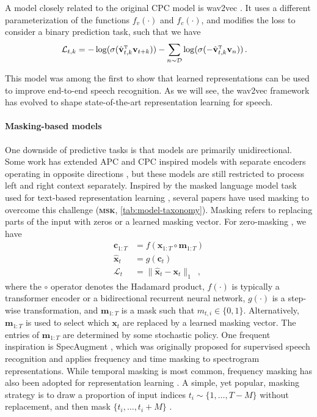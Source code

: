 {A model closely related to the original CPC model is wav2vec \parencite{schneider_wav2vec_2019}. It uses a different parameterization of the functions $f_v(\cdot)$ and $f_c(\cdot)$, and modifies the loss to consider a binary prediction task, such that we have
%
\begin{align}
    \mathcal{L}_{t,k} &= - \log(\sigma(\hat{\mathbf{v}}_{t,k}^{\text{\tiny T}}\mathbf{v}_{t+k})) - \sum_{n \sim \mathcal{D}} \log(\sigma(-\hat{\mathbf{v}}_{t,k}^{\text{\tiny T}}\mathbf{v}_{n})) \,.
    \label{eq_brief: wav2vec loss}
\end{align}

\noindent This model was among the first to show that learned representations can be used to improve end-to-end speech recognition. As we will see, the wav2vec framework has evolved to shape state-of-the-art representation learning for speech.


\paragraph{Masking-based models} One downside of predictive tasks is that models are primarily unidirectional. Some work has extended APC and CPC inspired models with separate encoders operating in opposite directions \parencite{ling_deep_2020, kawakami_learning_2020, borgholt_scaling_2021}, but these models are still restricted to process left and right context separately. Inspired by the masked language model task used for text-based representation learning \parencite{devlin_bert_2018}, several papers have used masking to overcome this challenge (\textbf{\textsc{msk}}, \cref{tab:model-taxonomy}). Masking refers to replacing parts of the input with zeros or a learned masking vector. For zero-masking \parencite{jiang_improving_2019, liu_mockingjay_2020, wang_unsupervised_2020, chi_audio_2020, ling_decoar_2020}, we have
\begin{align}
    \mathbf{c}_{1:T} &= f(\mathbf{x}_{1:T} \circ \mathbf{m}_{1:T})\\
    \mathbf{\hat{x}}_{t} &= g(\mathbf{c}_{t}) \\
    \mathcal{L}_t &= \lVert \mathbf{\hat{x}}_{t} - \mathbf{x}_{t} \rVert_1\enspace,
\end{align}
where the $\circ$ operator denotes the Hadamard product, $f(\cdot)$ is typically a transformer encoder or a bidirectional recurrent neural network, $g(\cdot)$ is a step-wise transformation, and $\mathbf{m}_{1:T}$ is a mask such that $m_{t,i} \in \{0,1\}$. Alternatively, $\mathbf{m}_{1:T}$ is used to select which $\mathbf{x}_t$ are replaced by a learned masking vector. The entries of $\mathbf{m}_{1:T}$ are determined by some stochastic policy. One frequent inspiration is SpecAugment \parencite{park_specaugment_2019}, which was originally proposed for supervised speech recognition and applies frequency and time masking to spectrogram representations.
While temporal masking is most common, frequency masking has also been adopted for representation learning  \parencite{wang_unsupervised_2020}. A simple, yet popular, masking strategy is to draw a proportion of input indices $t_i\sim\{1,\dots,T-M\}$ without replacement, and then mask $\{t_i, \dots, t_i+M\}$ \parencite{baevski_wav2vec_2020, hsu_hubert_2021, ling_decoar_2020}.

}
